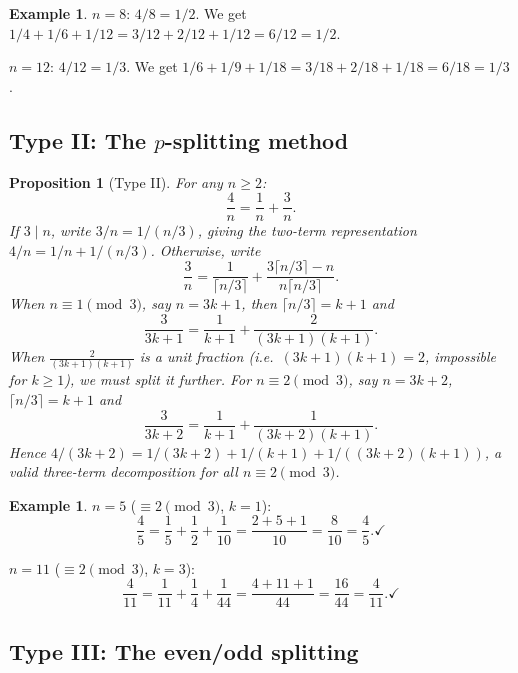\documentclass[12pt,a4paper]{amsart}
\newtheorem{proposition}[theorem]{Proposition}
\theoremstyle{definition}
\newtheorem{example}[theorem]{Example}
\begin{document}
\begin{example}
$n = 8$: $4/8 = 1/2$. We get $1/4 + 1/6 + 1/12 = 3/12 + 2/12 + 1/12 = 6/12 = 1/2$. \checkmark

$n = 12$: $4/12 = 1/3$. We get $1/6 + 1/9 + 1/18 = 3/18 + 2/18 + 1/18 = 6/18 = 1/3$. \checkmark
\end{example}

\subsection{Type II: The $p$-splitting method}

\begin{proposition}[Type II]\label{prop:typeII}
For any $n \geq 2$:
\[
  \frac{4}{n} = \frac{1}{n} + \frac{3}{n}.
\]
If $3 \mid n$, write $3/n = 1/(n/3)$, giving the two-term representation
$4/n = 1/n + 1/(n/3)$.  Otherwise, write
\[
  \frac{3}{n} = \frac{1}{\lceil n/3 \rceil} + \frac{3\lceil n/3 \rceil - n}{n \lceil n/3 \rceil}.
\]
When $n \equiv 1 \pmod 3$, say $n = 3k+1$, then $\lceil n/3 \rceil = k+1$ and
\[
  \frac{3}{3k+1} = \frac{1}{k+1} + \frac{2}{(3k+1)(k+1)}.
\]
When $\frac{2}{(3k+1)(k+1)}$ is a unit fraction (i.e.\ $(3k+1)(k+1) = 2$, impossible for $k\geq 1$),
we must split it further.  For $n \equiv 2 \pmod 3$, say $n = 3k+2$,
$\lceil n/3 \rceil = k+1$ and
\[
  \frac{3}{3k+2} = \frac{1}{k+1} + \frac{1}{(3k+2)(k+1)}.
\]
Hence $4/(3k+2) = 1/(3k+2) + 1/(k+1) + 1/((3k+2)(k+1))$,
a valid three-term decomposition for all $n \equiv 2 \pmod 3$.
\end{proposition}

\begin{example}
$n = 5$ ($\equiv 2 \pmod 3$, $k=1$):
\[
  \frac{4}{5} = \frac{1}{5} + \frac{1}{2} + \frac{1}{10} = \frac{2+5+1}{10} = \frac{8}{10} = \frac{4}{5}. \checkmark
\]

$n = 11$ ($\equiv 2 \pmod 3$, $k=3$):
\[
  \frac{4}{11} = \frac{1}{11} + \frac{1}{4} + \frac{1}{44} = \frac{4 + 11 + 1}{44} = \frac{16}{44} = \frac{4}{11}. \checkmark
\]
\end{example}

\subsection{Type III: The even/odd splitting}
\end{document}
